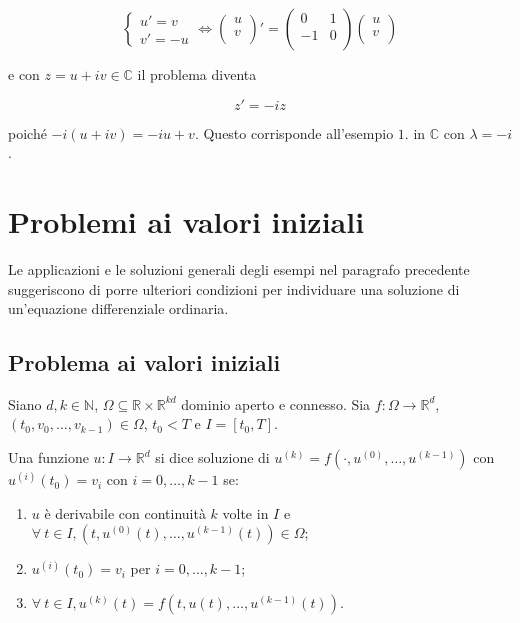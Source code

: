 \documentclass[hidelinks, 10pt]{report}
\begin{document}
\begin{enumerate}
\[
\begin{cases}
u' = v \\
v' = -u
\end{cases} \iff \begin{pmatrix}
	u \\
	v \\
\end{pmatrix} ' = \begin{pmatrix}
	 0 & 1 \\
	-1 & 0 \\
\end{pmatrix} \begin{pmatrix}
	u \\
	v \\
\end{pmatrix}
\]

e con $ z = u + iv \in \mathbb{C} $ il problema diventa

\[ z' = -i z \]

poich\'e $ -i(u + iv) = -i u + v $. Questo corrisponde all'esempio $ 1. $ in $ \mathbb{C} $ con $ \lambda = -i $.
\end{enumerate}

\section{Problemi ai valori iniziali}
Le applicazioni e le soluzioni generali degli esempi nel paragrafo precedente suggeriscono di porre ulteriori condizioni per individuare una soluzione di un'equazione differenziale ordinaria.

\subsection{Problema ai valori iniziali}	\label{section:3.1}
Siano $ d, k \in \mathbb{N} $, $ \Omega \subseteq \mathbb{R} \times \mathbb{R}^{kd} $ dominio aperto e connesso. Sia $ f: \Omega \to \mathbb{R}^{d} $, $ (t_{0}, v_{0}, \dotsc, v_{k-1}) \in \Omega $, $ t_{0} < T $ e $ I = [t_{0}, T] $.

Una funzione $ u: I \to \mathbb{R}^{d} $ si dice soluzione di $ u^{(k)} = f(\cdot, u^{(0)}, \dotsc, u^{(k-1)}) $ con $ u^{(i)} (t_{0}) = v_{i} $ con $ i = 0, \dotsc, k - 1 $ se:
\begin{enumerate}
\item $ u $ \`e derivabile con continuit\`a $ k $ volte in $ I $ e $ \forall\ t \in I, \left( t, u^{(0)}(t), \dotsc, u^{(k-1)}(t) \right) \in \Omega $;
\item $ u^{(i)} (t_{0}) = v_{i} $ per $ i = 0, \dotsc, k - 1 $;
\item $ \forall\ t \in I, u^{(k)}(t) = f \left( t, u(t), \dotsc, u^{(k-1)}(t) \right) $.
\end{enumerate}
\end{document}
